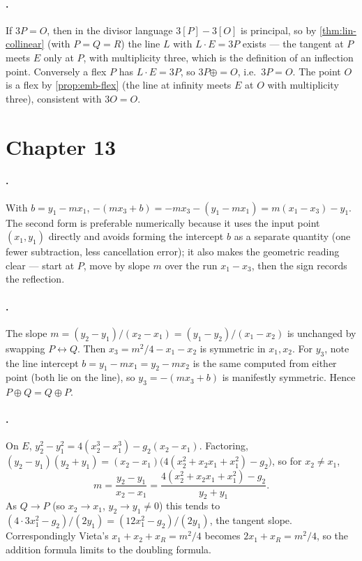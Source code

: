 \paragraph{.}
If \(3P = O\), then in the divisor language \(3[P] - 3[O]\) is principal, so by
\cref{thm:lin-collinear} (with \(P = Q = R\)) the line \(L\) with \(L \cdot E = 3P\)
exists --- the tangent at \(P\) meets \(E\) only at \(P\), with multiplicity three,
which is the definition of an inflection point. Conversely a flex \(P\) has
\(L \cdot E = 3P\), so \(3P \oplus = O\), i.e.\ \(3P = O\). The point \(O\) is a
flex by \cref{prop:emb-flex} (the line at infinity meets \(E\) at \(O\) with
multiplicity three), consistent with \(3O = O\).

\section{Chapter 13}
\label{sec:soln-ch13}

\paragraph{.}
With \(b = y_1 - m x_1\), \(-(m x_3 + b) = -m x_3 - (y_1 - m x_1) = m(x_1 - x_3)
- y_1\). The second form is preferable numerically because it uses the input point
\((x_1, y_1)\) directly and avoids forming the intercept \(b\) as a separate
quantity (one fewer subtraction, less cancellation error); it also makes the
geometric reading clear --- start at \(P\), move by slope \(m\) over the run
\(x_1 - x_3\), then the sign records the reflection.

\paragraph{.}
The slope \(m = (y_2-y_1)/(x_2-x_1) = (y_1-y_2)/(x_1-x_2)\) is unchanged by
swapping \(P \leftrightarrow Q\). Then \(x_3 = m^2/4 - x_1 - x_2\) is symmetric in
\(x_1, x_2\). For \(y_3\), note the line intercept \(b = y_1 - m x_1 = y_2 - m x_2\)
is the same computed from either point (both lie on the line), so
\(y_3 = -(m x_3 + b)\) is manifestly symmetric. Hence \(P \oplus Q = Q \oplus P\).

\paragraph{.}
On \(E\), \(y_2^2 - y_1^2 = 4(x_2^3 - x_1^3) - g_2(x_2 - x_1)\). Factoring,
\((y_2-y_1)(y_2+y_1) = (x_2-x_1)\bigl(4(x_2^2 + x_2 x_1 + x_1^2) - g_2\bigr)\), so
for \(x_2 \ne x_1\),
\[
  m = \frac{y_2 - y_1}{x_2 - x_1} = \frac{4(x_2^2 + x_2 x_1 + x_1^2) - g_2}{y_2 + y_1}.
\]
As \(Q \to P\) (so \(x_2 \to x_1\), \(y_2 \to y_1 \ne 0\)) this tends to
\((4 \cdot 3x_1^2 - g_2)/(2y_1) = (12x_1^2 - g_2)/(2y_1)\), the tangent slope.
Correspondingly Vieta's \(x_1 + x_2 + x_R = m^2/4\) becomes \(2x_1 + x_R = m^2/4\),
so the addition formula limits to the doubling formula.

